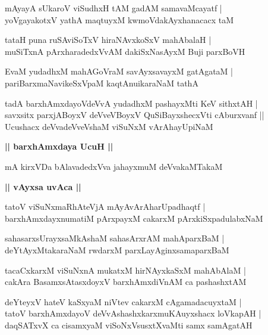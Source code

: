 \documentclass[twoside,12pt,openright]{book}
\newcounter{shloka}[chapter]
\def\uvaca#1{\centerline{{\large\textbf{#1}}}}
\begin{document}
\begin{shloka}%
mAyayA sUkaroV viSudhxH tAM gadAM samavaMcayatf |\\
yoVgayakotxV yathA maqtuyxM kwmoVdakAyxhanacacx taM 
\end{shloka}

\begin{shloka}%
tataH puna ruSAviSoTxV hiraNAvxkoSxV mahAbalaH |\\
muSiTxnA pArxharadedxVvAM dakiSxNasAyxM Buji parxBoVH 
\end{shloka}

\begin{shloka}%
EvaM yudadhxM mahAGoVraM savAyxsavayxM gatAgataM |\\
pariBarxmaNavikeSxVpaM kaqtAnuikaraNaM tathA 
\end{shloka}

\begin{shloka}%
tadA barxhAmxdayoVdeVvA yudadhxM pashayxMti KeV sithxtAH |\\
savxsitx parxjABoyxV deVveVBoyxV QuSiBayxshecxVti cAburxvanf ||\\
Ucushacx deVvadeVveVshaM viSuNxM vArAhayUpiNaM 
\end{shloka}

\uvaca{|| barxhAmxdaya UcuH ||}

\begin{shloka}%
mA kirxVDa bAlavadedxVva jahayxmuM deVvakaMTakaM 
\end{shloka}

\uvaca{|| vAyxsa uvAca ||}

\begin{shloka}%
tatoV viSuNxmaRhAteVjA mAyAvArAharUpadhaqtf |\\
barxhAmxdayxnumatiM pArxpayxM cakarxM pArxkiSxpadulabxNaM 
\end{shloka}

\begin{shloka}%
sahasarxsUrayxsaMkAshaM sahasArxrAM mahAparxBaM |\\
deYtAyxMtakaraNaM rwdarxM parxLayAginxsamaparxBaM 
\end{shloka}

\begin{shloka}%
tacaCxkarxM viSuNxnA mukatxM hirNAyxkaSxM mahAbAlaM |\\
cakAra BasamxsAtasxdoyxV barxhAmxdiVnAM ca pashashxtAM 
\end{shloka}

\begin{shloka}%
deYteyxV hateV kaSxyaM niVtev cakarxM cAgamadacuyxtaM |\\
tatoV barxhAmxdayoV deVvAshashxkarxmuKAuyxshacx loVkapAH |\\
daqSATxvX ca cisamxyaM viSoNxVsusxtXvaMti samx samAgatAH 
\end{shloka}
\end{document}
